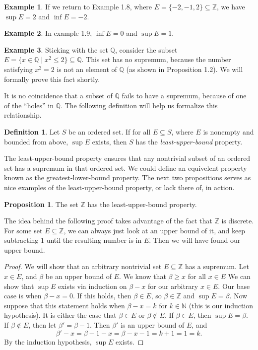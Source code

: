 \documentclass{article}
\newcommand{\N}{\mathbb{N}}
\newcommand{\Q}{\mathbb{Q}}
\newcommand{\Z}{\mathbb{Z}}
\theoremstyle{definition}
\newtheorem{proposition}{Proposition}[section]
\newtheorem{definition}{Definition}[section]
\newtheorem{example}{Example}[section]
\begin{document}
	\begin{example}
		If we return to Example 1.8, where $ E=\{-2,-1,2\}\subseteq\Z $, we have $ \sup E=2 $ and $ \inf E=-2 $. 
	\end{example}
	\begin{example}
		In example 1.9, $ \inf E=0 $ and $ \sup E=1 $.
	\end{example}
	\begin{example}
		Sticking with the set $ \Q$, consider the subset $ E=\{x\in\Q\mid x^2\le 2\}\subseteq \Q $. This set has no supremum, because the number satisfying $ x^2=2 $ is not an element of $ \Q $ (as shown in Proposition 1.2). We will formally prove this fact shortly. 
	\end{example}
	It is no coincidence that a subset of $ \Q $ fails to have a supremum, because of one of the ``holes'' in $ \Q $. The following definition will help us formalize this relationship. 
	\begin{definition}\label{def}
		Let $ S $ be an ordered set. If for all $ E\subseteq S $, where $ E $ is nonempty and bounded from above, $ \sup E $ exists, then $ S $ has the \textit{\color{red}least-upper-bound} property. 
	\end{definition}
	The least-upper-bound property ensures that any nontrivial subset of an ordered set has a supremum in that ordered set. We could define an equivelent property known as the greatest-lower-bound property. The next two propositions serves as nice examples of the least-upper-bound property, or lack there of,  in action.
	\begin{proposition}
		The set $ \Z $ has the least-upper-bound property.
	\end{proposition}
	The idea behind the following proof takes advantage of the fact that $ \Z $ is discrete. For some set $ E\subseteq \Z $, we can always just look at an upper bound of it, and keep subtracting $ 1 $ until the resulting number is in $ E $. Then we will have found our upper bound.
	\begin{proof}
		We will show that an arbitrary nontrivial set $ E\subseteq \Z $ has a supremum. Let $ x\in E $, and $ \beta $ be an upper bound of $ E $. We know that $ \beta\ge x $ for all $ x\in E $ We can show that $ \sup E $ exists via induction on $ \beta-x $ for our arbitrary $ x\in E $. Our base case is when $ \beta-x=0 $. If this holds, then $ \beta\in E $, so $ \beta\in\Z $ and $ \sup E=\beta $. Now suppose that this statement holds when $ \beta-x=k $ for $ k\in\N $ (this is our induction hypothesis). It is either the case that $ \beta\in E $ or $ \beta\notin E $. If $ \beta\in E $, then $ \sup E=\beta $. If $ \beta \notin E $, then let $ \beta'=\beta -1 $. Then $ \beta' $ is an upper bound of $ E $, and $$\beta'-x=\beta-1-x=\beta-x-1=k+1=1=k .$$ By the induction hypothesis, $ \sup E $ exists.   
	\end{proof}
\end{document}
